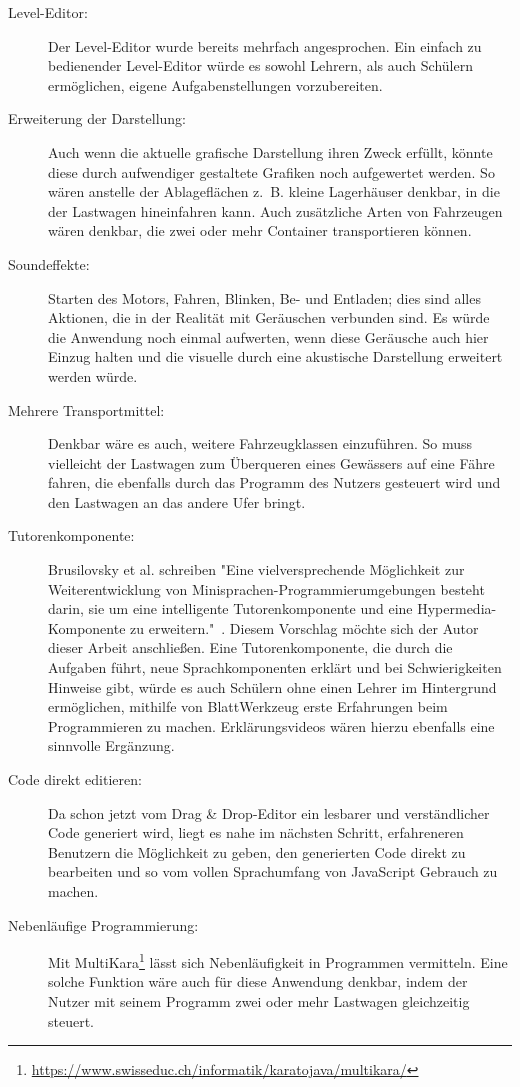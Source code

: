 \begin{description}
  \item[Level-Editor:] Der Level-Editor wurde bereits mehrfach angesprochen. Ein einfach zu bedienender Level-Editor würde es sowohl Lehrern, als auch Schülern ermöglichen, eigene Aufgabenstellungen vorzubereiten.
  \item[Erweiterung der Darstellung:] Auch wenn die aktuelle grafische Darstellung ihren Zweck erfüllt, könnte diese durch aufwendiger gestaltete Grafiken noch aufgewertet werden. So wären anstelle der Ablageflächen z.~B. kleine Lagerhäuser denkbar, in die der Lastwagen hineinfahren kann. Auch zusätzliche Arten von Fahrzeugen wären denkbar, die zwei oder mehr Container transportieren können.
  \item[Soundeffekte:] Starten des Motors, Fahren, Blinken, Be- und Entladen; dies sind alles Aktionen, die in der Realität mit Geräuschen verbunden sind. Es würde die Anwendung noch einmal aufwerten, wenn diese Geräusche auch hier Einzug halten und die visuelle durch eine akustische Darstellung erweitert werden würde.
  \item[Mehrere Transportmittel:] Denkbar wäre es auch, weitere Fahrzeugklassen einzuführen. So muss vielleicht der Lastwagen zum Überqueren eines Gewässers auf eine Fähre fahren, die ebenfalls durch das Programm des Nutzers gesteuert wird und den Lastwagen an das andere Ufer bringt.
  \item[Tutorenkomponente:] Brusilovsky et al. schreiben "Eine vielversprechende Möglichkeit zur Weiterentwicklung von Minisprachen-Programmierumgebungen besteht darin, sie um eine intelligente Tutorenkomponente und eine Hy\-per\-me\-dia-Kom\-po\-nen\-te zu erweitern."~\cite[80]{brusilovsky1997}. Diesem Vorschlag möchte sich der Autor dieser Arbeit anschließen. Eine Tutorenkomponente, die durch die Aufgaben führt, neue Sprachkomponenten erklärt und bei Schwierigkeiten Hinweise gibt, würde es auch Schülern ohne einen Lehrer im Hintergrund ermöglichen, mithilfe von BlattWerkzeug erste Erfahrungen beim Programmieren zu machen. Erklärungsvideos wären hierzu ebenfalls eine sinnvolle Ergänzung.
  \item[Code direkt editieren:] Da schon jetzt vom Drag \& Drop-Edi\-tor ein lesbarer und verständlicher Code generiert wird, liegt es nahe im nächsten Schritt, erfahreneren Benutzern die Möglichkeit zu geben, den generierten Code direkt zu bearbeiten und so vom vollen Sprachumfang von JavaScript Gebrauch zu machen.
  \item[Nebenläufige Programmierung:] Mit MultiKara\footnote{\url{https://www.swisseduc.ch/informatik/karatojava/multikara/}} lässt sich Nebenläufigkeit in Programmen vermitteln. Eine solche Funktion wäre auch für diese Anwendung denkbar, indem der Nutzer mit seinem Programm zwei oder mehr Lastwagen gleichzeitig steuert.
\end{description}

